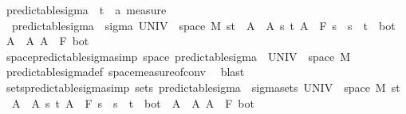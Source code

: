 \begin{isabellebody}
\ predictable{\isacharunderscore}{\kern0pt}sigma\ {\isacharcolon}{\kern0pt}{\isacharcolon}{\kern0pt}\ {\isachardoublequoteopen}{\isacharparenleft}{\kern0pt}{\isacharprime}{\kern0pt}t\ {\isasymtimes}\ {\isacharprime}{\kern0pt}a{\isacharparenright}{\kern0pt}\ measure{\isachardoublequoteclose}\ \isanewline
\ \ {\isachardoublequoteopen}predictable{\isacharunderscore}{\kern0pt}sigma\ {\isacharequal}{\kern0pt}\ sigma\ {\isacharparenleft}{\kern0pt}UNIV\ {\isasymtimes}\ space\ M{\isacharparenright}{\kern0pt}\ {\isacharparenleft}{\kern0pt}{\isacharbraceleft}{\kern0pt}{\isacharbraceleft}{\kern0pt}s{\isacharless}{\kern0pt}{\isachardot}{\kern0pt}{\isachardot}{\kern0pt}t{\isacharbraceright}{\kern0pt}\ {\isasymtimes}\ A\ {\isacharbar}{\kern0pt}\ A\ s\ t{\isachardot}{\kern0pt}\ A\ {\isasymin}\ F\ s\ {\isasymand}\ s\ {\isacharless}{\kern0pt}\ t{\isacharbraceright}{\kern0pt}\ {\isasymunion}\ {\isacharbraceleft}{\kern0pt}{\isacharbraceleft}{\kern0pt}bot{\isacharbraceright}{\kern0pt}\ {\isasymtimes}\ A\ {\isacharbar}{\kern0pt}\ A{\isachardot}{\kern0pt}\ A\ {\isasymin}\ F\ bot{\isacharbraceright}{\kern0pt}{\isacharparenright}{\kern0pt}{\isachardoublequoteclose}\isanewline
\isanewline
{}\isamarkupfalse%
\ space{\isacharunderscore}{\kern0pt}predictable{\isacharunderscore}{\kern0pt}sigma{\isacharbrackleft}{\kern0pt}simp{\isacharbrackright}{\kern0pt}{\isacharcolon}{\kern0pt}\ {\isachardoublequoteopen}space\ predictable{\isacharunderscore}{\kern0pt}sigma\ {\isacharequal}{\kern0pt}\ {\isacharparenleft}{\kern0pt}UNIV\ {\isasymtimes}\ space\ M{\isacharparenright}{\kern0pt}{\isachardoublequoteclose}%
\isadelimproof
\ %
\endisadelimproof
%
\isatagproof
{}\isamarkupfalse%
\ predictable{\isacharunderscore}{\kern0pt}sigma{\isacharunderscore}{\kern0pt}def\ space{\isacharunderscore}{\kern0pt}measure{\isacharunderscore}{\kern0pt}of{\isacharunderscore}{\kern0pt}conv\ \isamarkupfalse%
\ blast%
\endisatagproof
{\isafoldproof}%
%
\isadelimproof
%
\endisadelimproof
\isanewline
\isanewline
{}\isamarkupfalse%
\ sets{\isacharunderscore}{\kern0pt}predictable{\isacharunderscore}{\kern0pt}sigma{\isacharbrackleft}{\kern0pt}simp{\isacharbrackright}{\kern0pt}{\isacharcolon}{\kern0pt}\ {\isachardoublequoteopen}sets\ predictable{\isacharunderscore}{\kern0pt}sigma\ {\isacharequal}{\kern0pt}\ sigma{\isacharunderscore}{\kern0pt}sets\ {\isacharparenleft}{\kern0pt}UNIV\ {\isasymtimes}\ space\ M{\isacharparenright}{\kern0pt}\ {\isacharparenleft}{\kern0pt}{\isacharbraceleft}{\kern0pt}{\isacharbraceleft}{\kern0pt}s{\isacharless}{\kern0pt}{\isachardot}{\kern0pt}{\isachardot}{\kern0pt}t{\isacharbraceright}{\kern0pt}\ {\isasymtimes}\ A\ {\isacharbar}{\kern0pt}\ A\ s\ t{\isachardot}{\kern0pt}\ A\ {\isasymin}\ F\ s\ {\isasymand}\ s\ {\isacharless}{\kern0pt}\ t{\isacharbraceright}{\kern0pt}\ {\isasymunion}\ {\isacharbraceleft}{\kern0pt}{\isacharbraceleft}{\kern0pt}bot{\isacharbraceright}{\kern0pt}\ {\isasymtimes}\ A\ {\isacharbar}{\kern0pt}\ A{\isachardot}{\kern0pt}\ A\ {\isasymin}\ F\ bot{\isacharbraceright}{\kern0pt}{\isacharparenright}{\kern0pt}{\isachardoublequoteclose}\ \isanewline

\end{isabellebody}
